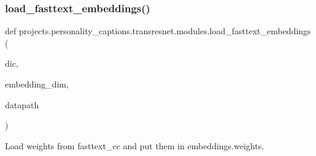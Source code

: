 \subsubsection{\texorpdfstring{load\+\_\+fasttext\+\_\+embeddings()}{load\_fasttext\_embeddings()}}
{\footnotesize\ttfamily def projects.\+personality\+\_\+captions.\+transresnet.\+modules.\+load\+\_\+fasttext\+\_\+embeddings (\begin{DoxyParamCaption}\item[{}]{dic,  }\item[{}]{embedding\+\_\+dim,  }\item[{}]{datapath }\end{DoxyParamCaption})}

\begin{DoxyVerb}Load weights from fasttext_cc and put them in embeddings.weights.
\end{DoxyVerb}
 